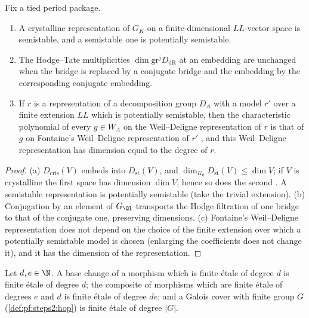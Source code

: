 \begin{proposition}\label{pf:geo:pstfacts}
Fix a tied period package.
\begin{enumerate}[label=(\alph*),nosep]
\item A crystalline representation of $G_K$ on a finite-dimensional $LL$-vector space is semistable, and a
  semistable one is potentially semistable.
\item The Hodge--Tate multiplicities $\dim\mathrm{gr}^jD_{\mathrm{dR}}$ at an embedding are unchanged when
  the bridge is replaced by a conjugate bridge and the embedding by the corresponding conjugate embedding.
\item If $r$ is a representation of a decomposition group $D_A$ with a model $r'$ over a finite extension
  $LL$ which is potentially semistable, then the characteristic polynomial of every $g\in W_A$ on the
  Weil--Deligne representation of $r$ is that of $g$ on Fontaine's Weil--Deligne representation of $r'$
  \cite{Fontaine1994rss}, and this Weil--Deligne representation has dimension equal to the degree of $r$.
\end{enumerate}
\end{proposition}

\begin{proof}
(a) $D_{\mathrm{cris}}(V)$ embeds into $D_{\mathrm{st}}(V)$, and $\dim_{K_0}D_{\mathrm{st}}(V)\le\dim V$; if $V$ is
crystalline the first space has dimension $\dim V$, hence so does the second \cite{Fontaine1994rss}. A
semistable representation is potentially semistable (take the trivial extension). (b) Conjugation by an
element of $G_{\Ql}$ transports the Hodge filtration of one bridge to that of the conjugate one,
preserving dimensions. (c) Fontaine's Weil--Deligne representation does not depend on the choice of the
finite extension over which a potentially semistable model is chosen (enlarging the coefficients does not
change it), and it has the dimension of the representation.
\end{proof}

\begin{lemma}\label{pf:geo:fetbasic}
Let $d,e\in\N$. A base change of a morphism which is finite \'etale of degree $d$ is finite \'etale of degree
$d$; the composite of morphisms which are finite \'etale of degrees $e$ and $d$ is finite \'etale of degree
$de$; and a Galois cover with finite group $G$ (\cref{def:pf:steps2:hop}) is finite \'etale of degree $|G|$.
\end{lemma}

